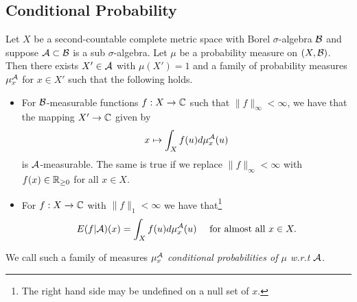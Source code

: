 \documentclass[twoside, a4paper, 10pt]{amsart}
\begin{document}
\subsection{Conditional Probability}

\begin{thm} Let $X$ be a second-countable complete metric space with Borel $\sigma$-algebra $\mathcal{B}$ and suppose $\mathcal{A} \subset \mathcal{B}$ is a sub $\sigma$-algebra. Let $\mu$ be a probability measure on $(X,\mathcal{B})$. Then there exists $X' \in \mathcal{A}$ with $\mu(X')=1$ and a family of probability measures $\mu_x^{\mathcal{A}}$ for $x \in X'$ such that the following holds.

\begin{itemize}
	\item For $\mathcal{B}$-measurable functions $f:X \to \mathbb{C}$ such that $\|f\|_{\infty} < \infty$, we have that the mapping $X' \to \mathbb{C}$ given by $$x \mapsto \int_X f(u) d\mu_x^{\mathcal{A}} (u)$$ is $\mathcal{A}$-measurable. The same is true if we replace $\|f\|_{\infty} < \infty$ with $f(x) \in \mathbb{R}_{\geq 0}$ for all $x \in X$.
	\item For $f: X \to \mathbb{C}$ with $\|f\|_1 < \infty$ we have that\footnote{The right hand side may be undefined on a null set of $x$.}  $$E(f|\mathcal{A})(x) = \int_X f(u) d\mu_x^{\mathcal{A}} (u) \quad \text{ for almost all } x \in X.$$

\end{itemize}

\end{thm}

\begin{mydef} We call such a family of measures $\mu^{\mathcal{A}}_x$ \textit{conditional probabilities of $\mu$ w.r.t $\mathcal{A}$}.

\end{mydef}
\end{document}
